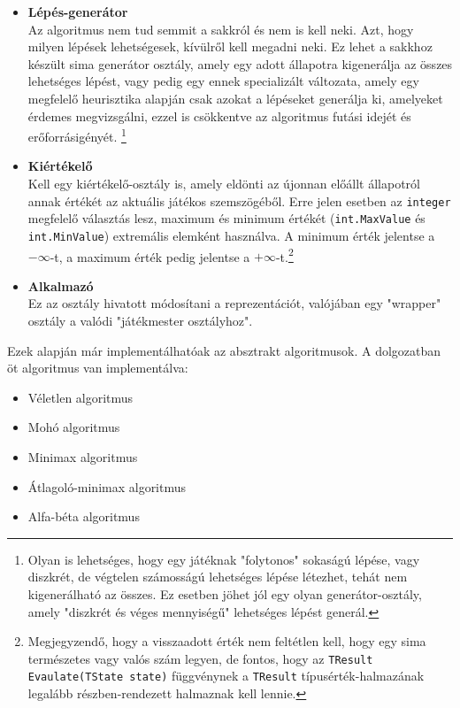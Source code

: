 \documentclass[twoside, a4paper, 12pt]{article}
\begin{document}
\begin{itemize}
	\item \textbf{Lépés-generátor} \\
	Az algoritmus nem tud semmit a sakkról és nem is kell neki. Azt, hogy milyen lépések lehetségesek, kívülről kell megadni neki. Ez lehet a sakkhoz készült sima generátor osztály, amely egy adott állapotra kigenerálja az összes lehetséges lépést, vagy pedig egy ennek specializált változata, amely egy megfelelő heurisztika alapján csak azokat a lépéseket generálja ki, amelyeket érdemes megvizsgálni, ezzel is csökkentve az algoritmus futási idejét és erőforrásigényét. \footnote{Olyan is lehetséges, hogy egy játéknak "folytonos" sokaságú lépése, vagy diszkrét, de végtelen számosságú lehetséges lépése létezhet, tehát nem kigenerálható az összes. Ez esetben jöhet jól egy olyan generátor-osztály, amely "diszkrét és véges mennyiségű" lehetséges lépést generál.}
	
	\item \textbf{Kiértékelő} \\
	Kell egy kiértékelő-osztály is, amely eldönti az újonnan előállt állapotról annak értékét az aktuális játékos szemszögéből. Erre jelen esetben az \texttt{integer} megfelelő választás lesz, maximum és minimum értékét (\texttt{int.MaxValue} és \texttt{int.MinValue}) extremális elemként használva. A minimum érték jelentse a $-\infty$-t, a maximum érték pedig jelentse a $+\infty$-t.\footnote{Megjegyzendő, hogy a visszaadott érték nem feltétlen kell, hogy egy sima természetes vagy valós szám legyen, de fontos, hogy az \texttt{TResult Evaulate(TState state)} függvénynek a \texttt{TResult} típusérték-halmazának legalább részben-rendezett halmaznak kell lennie.}
	
	
	\item \textbf{Alkalmazó} \\
	Ez az osztály hivatott módosítani a reprezentációt, valójában egy "wrapper" osztály a valódi "játékmester osztályhoz".
\end{itemize}

Ezek alapján már implementálhatóak az absztrakt algoritmusok. A dolgozatban öt algoritmus van implementálva:
\begin{itemize}
	\item Véletlen algoritmus
	\item Mohó algoritmus
	\item Minimax algoritmus
	\item Átlagoló-minimax algoritmus
	\item Alfa-béta algoritmus
\end{itemize}
\end{document}
